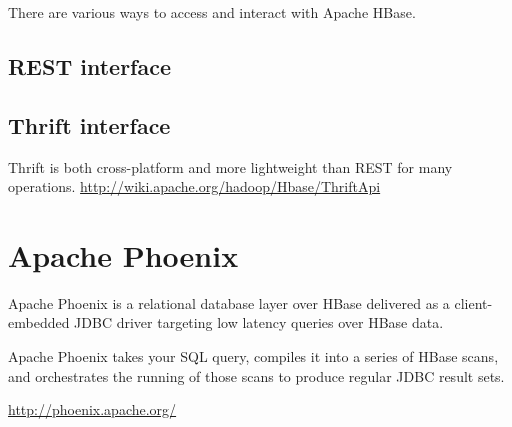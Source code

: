 There are various ways to access and interact with Apache HBase. 

\subsection{REST interface}

\subsection{Thrift interface}


Thrift is both cross-platform and more lightweight than REST for many
operations. \url{http://wiki.apache.org/hadoop/Hbase/ThriftApi}


\section{Apache Phoenix}
\label{sec:Phoenix}

Apache Phoenix is a relational database layer over HBase delivered as a
client-embedded JDBC driver targeting low latency queries over HBase data. 

Apache Phoenix takes your SQL query, compiles it into a series of HBase scans,
and orchestrates the running of those scans to produce regular JDBC result sets.

\url{http://phoenix.apache.org/}
